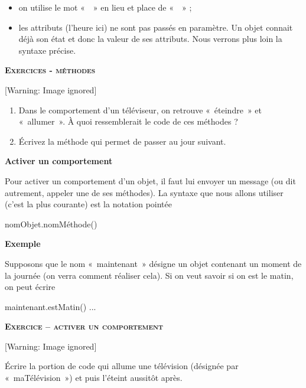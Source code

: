 \liststyleListv
\begin{itemize}
\item {
on utilise le mot «~~» en lieu et place de
«~~» ;}
\item {
les attributs (l'heure ici) ne sont pas passés en
paramètre. Un objet connait déjà son état et donc la valeur de ses
attributs. Nous verrons plus loin la syntaxe précise.}
\end{itemize}
{\sffamily\bfseries\scshape
Exe\textup{rcices - méthodes}}

\begin{center}
 [Warning: Image ignored] %

\end{center}
\liststyleWWviiiNumi
\begin{enumerate}
\item {
Dans le comportement d'un téléviseur, on retrouve
«~éteindre~» et «~allumer~». À quoi ressemblerait le code de ces
méthodes ?}
\item {
Écrivez la méthode qui permet de passer au jour suivant.}
\end{enumerate}

\bigskip


\bigskip

{\sffamily\bfseries
Activer un comportement}

{
Pour activer un comportement d'un objet, il faut lui
envoyer un message (ou dit autrement, appeler une de ses méthodes). La
syntaxe que nous allons utiliser (c'est la plus
courante) est la notation pointée}

{\sffamily
nomObjet.nomMéthode()}

{\bfseries
Exemple}

{
Supposons que le nom «~maintenant~» désigne un objet contenant un moment
de la journée (on verra comment réaliser cela). Si on veut savoir si on
est le matin, on peut écrire}

{\sffamily
{} maintenant.estMatin()  ...}


\bigskip

{\sffamily\bfseries\scshape
Exercice – activer un comportement}

\begin{center}
 [Warning: Image ignored] %

\end{center}
{
Écrire la portion de code qui allume une télévision (désignée par
«~maTélévision~») et puis l'éteint aussitôt après.}


